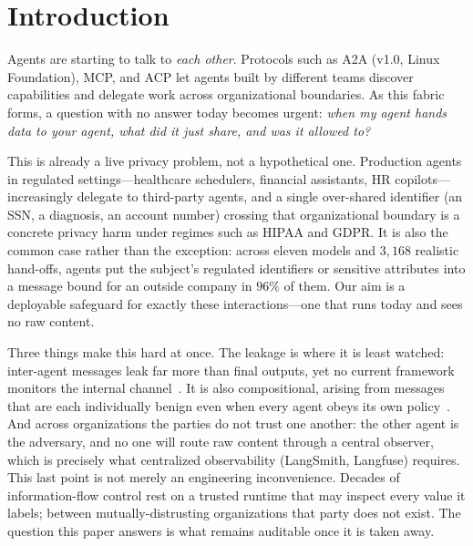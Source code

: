 \documentclass[sigconf,anonymous,review]{acmart}
\theoremstyle{acmplain}
\begin{document}

\maketitle

\section{Introduction}
Agents are starting to talk to \emph{each other}. Protocols such as A2A (v1.0,
Linux Foundation), MCP, and ACP let agents built by different teams discover
capabilities and delegate work across organizational boundaries. As this fabric
forms, a question with no answer today becomes urgent: \emph{when my agent hands
data to your agent, what did it just share, and was it allowed to?}

This is already a live privacy problem, not a hypothetical one. Production agents
in regulated settings---healthcare schedulers, financial assistants, HR
copilots---increasingly delegate to third-party agents, and a single over-shared
identifier (an SSN, a diagnosis, an account number) crossing that organizational
boundary is a concrete privacy harm under regimes such as HIPAA and GDPR. It is
also the common case rather than the exception: across eleven models and $3{,}168$ realistic hand-offs, agents put the subject's regulated identifiers or sensitive attributes into a message bound for an outside company in $96\%$ of them. Our aim is a
deployable safeguard for exactly these interactions---one that runs today and sees
no raw content.

Three things make this hard at once. The leakage is where it is least watched:
inter-agent messages leak far more than final outputs, yet no current framework
monitors the internal channel~\cite{agentleak}. It is also compositional, arising
from messages that are each individually benign even when every agent obeys its
own policy~\cite{sumleaks}. And across organizations the parties do not trust one
another: the other agent is the adversary, and no one will route raw content
through a central observer, which is precisely what centralized observability
(LangSmith, Langfuse) requires. This last point is not merely an engineering
inconvenience. Decades of information-flow control rest on a trusted runtime that
may inspect every value it labels; between mutually-distrusting organizations
that party does not exist. The question this paper answers is what remains
auditable once it is taken away.
\end{document}
